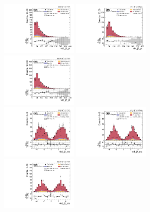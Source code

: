 \begin{figure}[!ht]
  \centering
  \includegraphics[width=0.335\textwidth]{analysis_plots/2016_zv/cr_vjets_l/vbf_j2_pt.pdf} \hspace{-10pt}
  \includegraphics[width=0.335\textwidth]{analysis_plots/2017_zv/cr_vjets_l/vbf_j2_pt.pdf} \hspace{-10pt}
  \includegraphics[width=0.335\textwidth]{analysis_plots/2018_zv/cr_vjets_l/vbf_j2_pt.pdf} \hspace{-10pt} \\
  \includegraphics[width=0.335\textwidth]{analysis_plots/2016_zv/cr_vjets_l/vbf_j2_eta.pdf} \hspace{-10pt}
  \includegraphics[width=0.335\textwidth]{analysis_plots/2017_zv/cr_vjets_l/vbf_j2_eta.pdf} \hspace{-10pt}
  \includegraphics[width=0.335\textwidth]{analysis_plots/2018_zv/cr_vjets_l/vbf_j2_eta.pdf} \hspace{-10pt} \\

\end{figure}
